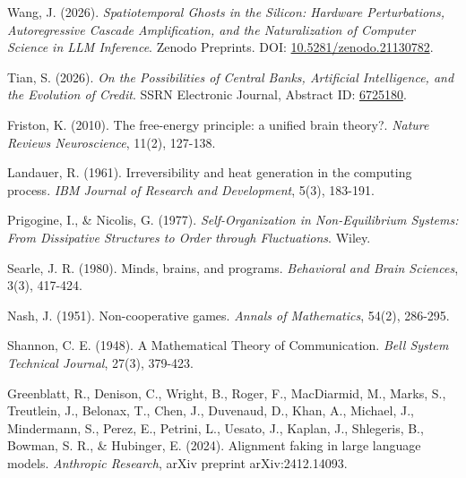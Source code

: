 \documentclass[11pt,a4paper]{article}
\begin{document}
\begin{enumerate}[label={[\arabic*]}, leftmargin=*]
    \item Wang, J. (2026). \textit{Spatiotemporal Ghosts in the Silicon: Hardware Perturbations, Autoregressive Cascade Amplification, and the Naturalization of Computer Science in LLM Inference}. Zenodo Preprints. DOI: \href{https://doi.org/10.5281/zenodo.21130782}{10.5281/zenodo.21130782}.
    \item Tian, S. (2026). \textit{On the Possibilities of Central Banks, Artificial Intelligence, and the Evolution of Credit}. SSRN Electronic Journal, Abstract ID: \href{http://ssrn.com/abstract=6725180}{6725180}.
    \item Friston, K. (2010). The free-energy principle: a unified brain theory?. \textit{Nature Reviews Neuroscience}, 11(2), 127-138.
    \item Landauer, R. (1961). Irreversibility and heat generation in the computing process. \textit{IBM Journal of Research and Development}, 5(3), 183-191.
    \item Prigogine, I., \& Nicolis, G. (1977). \textit{Self-Organization in Non-Equilibrium Systems: From Dissipative Structures to Order through Fluctuations}. Wiley.
    \item Searle, J. R. (1980). Minds, brains, and programs. \textit{Behavioral and Brain Sciences}, 3(3), 417-424.
    \item Nash, J. (1951). Non-cooperative games. \textit{Annals of Mathematics}, 54(2), 286-295.
    \item Shannon, C. E. (1948). A Mathematical Theory of Communication. \textit{Bell System Technical Journal}, 27(3), 379-423.
    \item Greenblatt, R., Denison, C., Wright, B., Roger, F., MacDiarmid, M., Marks, S., Treutlein, J., Belonax, T., Chen, J., Duvenaud, D., Khan, A., Michael, J., Mindermann, S., Perez, E., Petrini, L., Uesato, J., Kaplan, J., Shlegeris, B., Bowman, S. R., \& Hubinger, E. (2024). Alignment faking in large language models. \textit{Anthropic Research}, arXiv preprint arXiv:2412.14093.
\end{enumerate}
\end{document}
